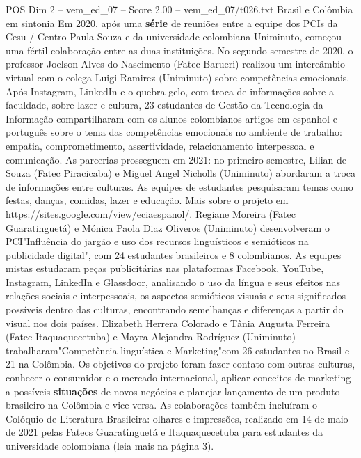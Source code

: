 \begin{textsample}{POS Dim 2 – vem\_ed\_07 – Score 2.00 – vem\_ed\_07/t026.txt}  \label{ex:f2_pos_160}
Brasil e Colômbia em sintonia Em 2020, após uma \textbf{série} de reuniões entre a equipe dos PCIs da Cesu / Centro Paula Souza e da universidade colombiana Uniminuto, começou uma fértil colaboração entre as duas instituições.
No segundo semestre de 2020, o professor Joelson Alves do Nascimento (Fatec Barueri) realizou um intercâmbio virtual com o colega Luigi Ramirez (Uniminuto) sobre competências emocionais.
Após Instagram, LinkedIn e o quebra-gelo, com troca de informações sobre a faculdade, sobre lazer e cultura, 23 estudantes de Gestão da Tecnologia da Informação compartilharam com os alunos colombianos artigos em espanhol e português sobre o tema das competências emocionais no ambiente de trabalho: empatia, comprometimento, assertividade, relacionamento interpessoal e comunicação.
As parcerias prosseguem em 2021: no primeiro semestre, Lilian de Souza (Fatec Piracicaba) e Miguel Angel Nicholls (Uniminuto) abordaram a troca de informações entre culturas.
As equipes de estudantes pesquisaram temas como festas, danças, comidas, lazer e educação.
Mais sobre o projeto em https://sites.google.com/view/eciaespanol/.
Regiane Moreira (Fatec Guaratinguetá) e Mónica Paola Diaz Oliveros (Uniminuto) desenvolveram o PCI"Influência do jargão e uso dos recursos linguísticos e semióticos na publicidade digital", com 24 estudantes brasileiros e 8 colombianos.
As equipes mistas estudaram peças publicitárias nas plataformas Facebook, YouTube, Instagram, LinkedIn e Glassdoor, analisando o uso da língua e seus efeitos nas relações sociais e interpessoais, os aspectos semióticos visuais e seus significados possíveis dentro das culturas, encontrando semelhanças e diferenças a partir do visual nos dois países.
Elizabeth Herrera Colorado e Tânia Augusta Ferreira (Fatec Itaquaquecetuba) e Mayra Alejandra Rodríguez (Uniminuto) trabalharam"Competência linguística e Marketing"com 26 estudantes no Brasil e 21 na Colômbia.
Os objetivos do projeto foram fazer contato com outras culturas, conhecer o consumidor e o mercado internacional, aplicar conceitos de marketing a possíveis \textbf{situações} de novos negócios e planejar lançamento de um produto brasileiro na Colômbia e vice-versa.
As colaborações também incluíram o Colóquio de Literatura Brasileira: olhares e impressões, realizado em 14 de maio de 2021 pelas Fatecs Guaratinguetá e Itaquaquecetuba para estudantes da universidade colombiana (leia mais na página 3).

\end{textsample}
